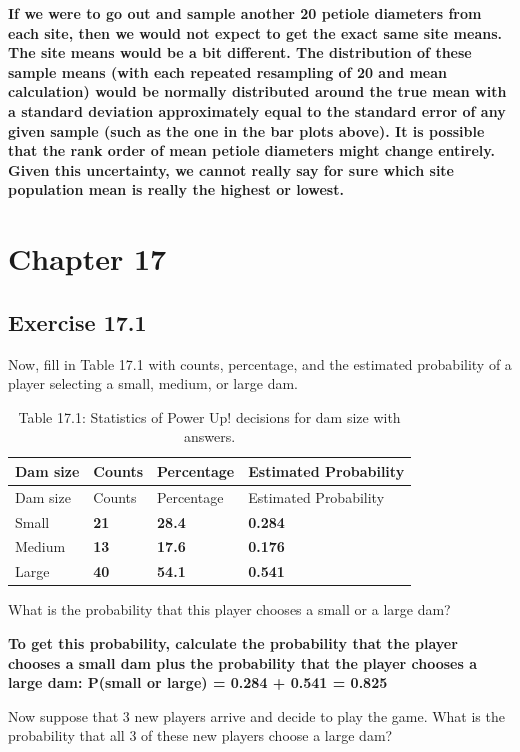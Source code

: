 \documentclass[
]{scrbook}
\begin{document}
\textbf{If we were to go out and sample another 20 petiole diameters from each site, then we would not expect to get the exact same site means. The site means would be a bit different. The distribution of these sample means (with each repeated resampling of 20 and mean calculation) would be normally distributed around the true mean with a standard deviation approximately equal to the standard error of any given sample (such as the one in the bar plots above). It is possible that the rank order of mean petiole diameters might change entirely. Given this uncertainty, we cannot really say for sure which site population mean is really the highest or lowest.}

\hypertarget{chapter-17}{%
\section{Chapter 17}\label{chapter-17}}

\hypertarget{exercise-17.1}{%
\subsection{Exercise 17.1}\label{exercise-17.1}}

Now, fill in Table 17.1 with counts, percentage, and the estimated probability of a player selecting a small, medium, or large dam.

\begin{longtable}[]{@{}llll@{}}
\caption{Table 17.1: Statistics of Power Up! decisions for dam size with answers.}\tabularnewline
\toprule
Dam size & Counts & Percentage & Estimated Probability \\
\midrule
\endfirsthead
\toprule
Dam size & Counts & Percentage & Estimated Probability \\
\midrule
\endhead
Small & \textbf{21} & \textbf{28.4} & \textbf{0.284} \\
Medium & \textbf{13} & \textbf{17.6} & \textbf{0.176} \\
Large & \textbf{40} & \textbf{54.1} & \textbf{0.541} \\
\bottomrule
\end{longtable}

What is the probability that this player chooses a small or a large dam?

\textbf{To get this probability, calculate the probability that the player chooses a small dam plus the probability that the player chooses a large dam: P(small or large) = 0.284 + 0.541 = 0.825}

Now suppose that 3 new players arrive and decide to play the game. What is the probability that all 3 of these new players choose a large dam?
\end{document}

